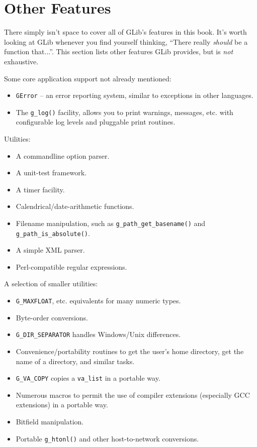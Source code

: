 \section{Other Features}

There simply isn't space to cover all of GLib's features in this book. It's worth looking at GLib whenever you find yourself thinking, ``There really \emph{should} be a function that...''. This section lists other features GLib provides, but is \emph{not} exhaustive.

Some core application support not already mentioned:
\begin{itemize}
  \item \lstinline{GError} -- an error reporting system, similar to exceptions in other languages.
  \item The \lstinline{g_log()} facility, allows you to print warnings, messages, etc. with configurable log levels and pluggable print routines.
\end{itemize}

Utilities:
\begin{itemize}
  \item A commandline option parser.
  \item A unit-test framework.
  \item A timer facility.
  \item Calendrical/date-arithmetic functions.
  \item Filename manipulation, such as \lstinline{g_path_get_basename()} and \lstinline{g_path_is_absolute()}.
  \item A simple XML parser.
  \item Perl-compatible regular expressions.
\end{itemize}

A selection of smaller utilities:
\begin{itemize}
  \item \lstinline{G_MAXFLOAT}, etc. equivalents for many numeric types.
  \item Byte-order conversions.
  \item \lstinline{G_DIR_SEPARATOR} handles Windows/Unix differences.
  \item Convenience/portability routines to get the user's home directory, get the name of a  directory, and similar tasks.
  \item \lstinline{G_VA_COPY} copies a \lstinline{va_list} in a portable way.
  \item Numerous macros to permit the use of compiler extensions (especially GCC extensions) in a portable way.
  \item Bitfield manipulation.
  \item Portable \lstinline{g_htonl()} and other host-to-network conversions.
\end{itemize}

